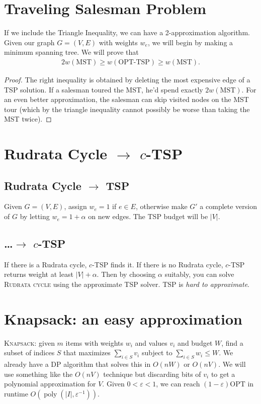 \section{Traveling Salesman Problem}
If we include the Triangle Inequality, we can have a 2-approximation algorithm.
Given our graph \(G = (V, E)\) with weights \(w_e\), we will begin by making a minimum spanning tree.
We will prove that
\begin{align}
2 w(\text{MST}) \geq w(\text{OPT-TSP}) \geq w(\text{MST}).
\end{align}
\begin{proof}
	The right inequality is obtained by deleting the most expensive edge of a TSP solution.
	If a salesman toured the MST, he'd spend exactly \(2w\left(\text{MST}\right)\).
	For an even better approximation, the salesman can skip visited nodes on the MST tour
	(which by the triangle inequality cannot possibly be worse than taking the MST twice).
\end{proof}

\section{Rudrata Cycle \(\to\) \(c\)-TSP}
\subsection{Rudrata Cycle \(\to\) TSP}
Given \(G = (V, E)\), assign \(w_e = 1\) if \(e\in E\), otherwise make \(G'\) a complete version of \(G\) by letting \(w_e = 1+\alpha\)
on new edges. The TSP budget will be \(\left|V\right|\).
\subsection{\ldots \(\to\) \(c\)-TSP}
If there is a Rudrata cycle, \(c\)-TSP finds it. If there is no Rudrata cycle, \(c\)-TSP returns weight at least \(\left|V\right| + \alpha\).
Then by choosing \(\alpha\) suitably, you can solve \textsc{Rudrata cycle} using the approximate TSP solver.
TSP is \emph{hard to approximate}.

\section{Knapsack: an easy approximation}
\textsc{Knapsack}: given \(m\) items with weights \(w_i\) and values \(v_i\) and budget \(W\), find a subset of indices \(S\)  that maximizes
\(\sum_{i \in S} v_i\) subject to \(\sum_{i\in S} w_i \leq W\). We already have a DP algorithm that solves this in \(O(nW)\) or \(O(nV)\).
We will use something like the \(O(nV)\) technique but discarding bits of \(v_i\) to get a polynomial approximation for \(V\).
Given \(0<\varepsilon<1\), we can reach \(\left(1 - \varepsilon\right)\text{OPT}\) in runtime \(O\left(\operatorname{poly}\left(\left|I\right|, \varepsilon^{-1}\right)\right)\).

